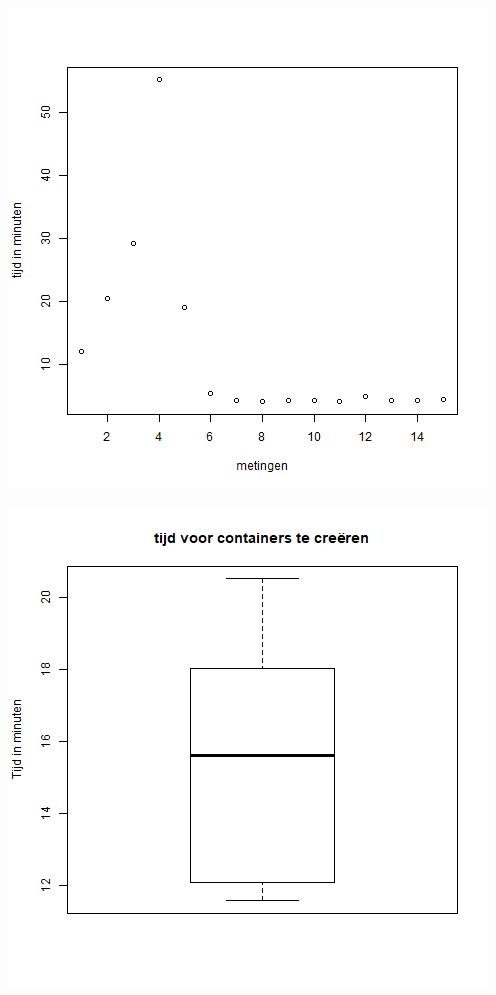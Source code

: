 \begin{center}
	\includegraphics[scale=0.5]{img/centosplotfull.png}
\end{center}

\begin{center}
	\includegraphics[scale=0.5]{img/centosboxplotfull.png}
\end{center}

